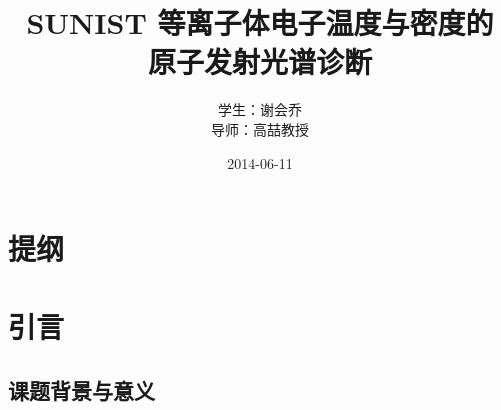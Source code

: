 \begin{CJK*}{UTF8}{kai}

%

\title[答辩]{SUNIST 等离子体电子温度与密度的\\ 原子发射光谱诊断}

\author[谢会乔]{
\quad
\begin{minipage}{3.5cm}
    学生：谢会乔\\
    导师：高\quad 喆\quad 教授
\end{minipage}
}


\date{2014-06-11}

\frame{\titlepage}

\section*{提纲}


\section{引言}

\subsection{课题背景与意义}


\end{CJK*}

